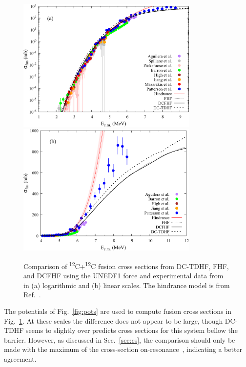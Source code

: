 \begin{figure}
	\centering
	\includegraphics[width=0.8\textwidth]{../Figures/CC/CrossSections.pdf}
	\includegraphics[width=0.8\textwidth]{../Figures/CC/CrossSectionsLinear.pdf}
	\caption{Comparison of \textsuperscript{12}C+\textsuperscript{12}C fusion cross sections from DC-TDHF, FHF, and DCFHF using the UNEDF1 force and experimental data from~\protect\citep{aguilera2006,spillane2007,zickefoose2011,barron-palos2006,high1977,jiang2018,mazarakis1973,patterson1969} in (a) logarithmic and (b) linear scales. The hindrance model is from Ref.~\protect\citep{jiang2007}.}
	\label{fig:xsec}
\end{figure}


The potentials of Fig.~\ref{fig:pots} are used to compute fusion cross sections in Fig.~\ref{fig:xsec}.
At these scales the difference does not appear to be large, though DC-TDHF seems to slightly over predicts cross sections for this system bellow the barrier.
However, as discussed in Sec.~\ref{sec:cs}, the comparison should only be made with the maximum of the cross-section on-resonance~\protect\citep{jiang2013}, indicating a better agreement. 

